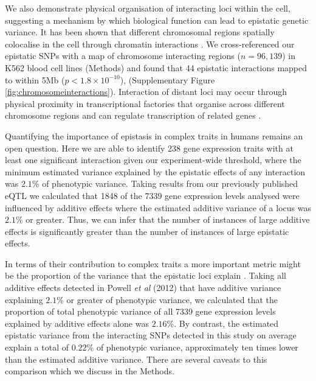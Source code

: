 \documentclass{article}
\begin{document}
We also demonstrate physical organisation of interacting loci within the cell, suggesting a mechanism by which biological function can lead to epistatic genetic variance. It has been shown that different chromosomal regions spatially colocalise in the cell through chromatin interactions \cite{Lieberman-Aiden2009}. We cross-referenced our epistatic SNPs with a map of chromosome interacting regions ($n = 96,139$) in K562 blood cell lines \cite{Lan2012} (Methods) and found that 44 epistatic interactions mapped to within 5Mb ($p < 1.8 \times 10^{-10}$), (Supplementary Figure \ref{fig:chromosomeinteractions}). Interaction of distant loci may occur through physical proximity in transcriptional factories that organise across different chromosome regions and can regulate transcription of related genes \cite{Rieder2012}.


Quantifying the importance of epistasis in complex traits in humans remains an open question. Here we are able to identify 238 gene expression traits with at least one significant interaction given our experiment-wide threshold, where the minimum estimated variance explained by the epistatic effects of any interaction was $2.1\%$ of phenotypic variance. Taking results from our previously published eQTL \cite{Powell2012} we calculated that 1848 of the 7339 gene expression levels analysed were influenced by additive effects where the estimated additive variance of a locus was $2.1\%$ or greater. Thus, we can infer that the number of instances of large additive effects is significantly greater than the number of instances of large epistatic effects.

In terms of their contribution to complex traits a more important metric might be the proportion of the variance that the epistatic loci explain \cite{Hill2008a}. Taking all additive effects detected in Powell \emph{et al} (2012) that have additive variance explaining $2.1\%$ or greater of phenotypic variance, we calculated that the proportion of total phenotypic variance of all 7339 gene expression levels explained by additive effects alone was $2.16\%$. By contrast, the estimated epistatic variance from the interacting SNPs detected in this study on average explain a total of $0.22\%$ of phenotypic variance, approximately ten times lower than the estimated additive variance. There are several caveats to this comparison which we discuss in the Methods.
\end{document}
